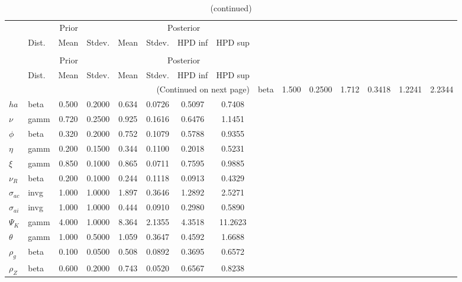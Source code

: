  
\begin{center}
\begin{longtable}{llcccccc} 
\caption{Results from Metropolis-Hastings (parameters)}
 \label{Table:MHPosterior:1}\\
\toprule 
  & \multicolumn{3}{c}{Prior}  &  \multicolumn{4}{c}{Posterior} \\
  \cmidrule(r{.75em}){2-4} \cmidrule(r{.75em}){5-8}
  & Dist. & Mean  & Stdev. & Mean & Stdev. & HPD inf & HPD sup\\
\midrule \endfirsthead 
\caption{(continued)}\\\toprule 
  & \multicolumn{3}{c}{Prior}  &  \multicolumn{4}{c}{Posterior} \\
  \cmidrule(r{.75em}){2-4} \cmidrule(r{.75em}){5-8}
  & Dist. & Mean  & Stdev. & Mean & Stdev. & HPD inf & HPD sup\\
\midrule \endhead 
\bottomrule \multicolumn{8}{r}{(Continued on next page)} \endfoot 
\bottomrule \endlastfoot 
${\sigma}$ & beta &   1.500 & 0.2500 &   1.712& 0.3418 &  1.2241 &  2.2344 \\ 
${ha}$ & beta &   0.500 & 0.2000 &   0.634& 0.0726 &  0.5097 &  0.7408 \\ 
$\nu$ & gamm &   0.720 & 0.2500 &   0.925& 0.1616 &  0.6476 &  1.1451 \\ 
${\phi}$ & beta &   0.320 & 0.2000 &   0.752& 0.1079 &  0.5788 &  0.9355 \\ 
${\eta}$ & gamm &   0.200 & 0.1500 &   0.344& 0.1100 &  0.2018 &  0.5231 \\ 
$\xi$ & gamm &   0.850 & 0.1000 &   0.865& 0.0711 &  0.7595 &  0.9885 \\ 
${\nu_R}$ & beta &   0.200 & 0.1000 &   0.244& 0.1118 &  0.0913 &  0.4329 \\ 
${\sigma_{ac}}$ & invg &   1.000 & 1.0000 &   1.897& 0.3646 &  1.2892 &  2.5271 \\ 
${\sigma_{ai}}$ & invg &   1.000 & 1.0000 &   0.444& 0.0910 &  0.2980 &  0.5890 \\ 
${\Psi_{K}}$ & gamm &   4.000 & 1.0000 &   8.364& 2.1355 &  4.3518 & 11.2623 \\ 
${\theta}$ & gamm &   1.000 & 0.5000 &   1.059& 0.3647 &  0.4592 &  1.6688 \\ 
${\rho_g}$ & beta &   0.100 & 0.0500 &   0.508& 0.0892 &  0.3695 &  0.6572 \\ 
${\rho_Z}$ & beta &   0.600 & 0.2000 &   0.743& 0.0520 &  0.6567 &  0.8238 \\ 

\end{longtable}
\end{center}
